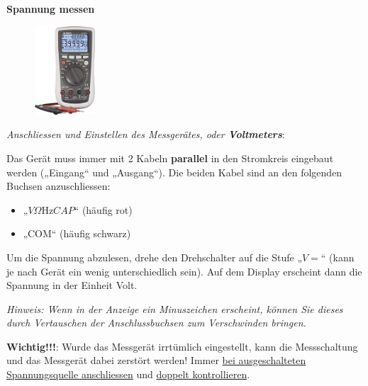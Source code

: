 \documentclass[11pt]{article}
\begin{document}
\newpage

\begin{tcolorbox}[width=\textwidth, %
    colback=white,colframe=gray!75!black]

\textbf{Spannung messen}



\begin{figure}
\vspace{-12pt}
  \centering
    \includegraphics[width=0.2\textwidth]{images/multimeter-vc-870.png}
\end{figure}

\textit{Anschliessen und Einstellen des Messgerätes, oder \textbf{Voltmeters}}:


Das Gerät muss immer mit 2 Kabeln \textbf{parallel} in den Stromkreis eingebaut werden („Eingang“ und  „Ausgang“). 
Die beiden Kabel sind an den folgenden Buchsen anzuschliessen:

\begin{itemize}[label={--}]
    \item „$V\Omega \si{\hertz}CAP$“   (häufig rot)
    \item „COM“  (häufig schwarz)
\end{itemize}

Um die Spannung abzulesen, drehe den Drehschalter auf die Stufe „$V=$“ (kann je nach Gerät ein wenig unterschiedlich sein). Auf dem Display erscheint dann die Spannung in der Einheit Volt.


\textit{Hinweis: Wenn in der Anzeige ein Minuszeichen erscheint, können Sie dieses durch Vertauschen der Anschlussbuchsen zum Verschwinden bringen.}
\end{tcolorbox}

\color{red}
\textbf{Wichtig!!!}: Wurde das Messgerät irrtümlich eingestellt, kann die Messschaltung und das Messgerät dabei zerstört werden! Immer \underline{bei ausgeschalteten Spannungsquelle anschliessen} und \underline{doppelt kontrollieren}.
\color{black}
\end{document}
